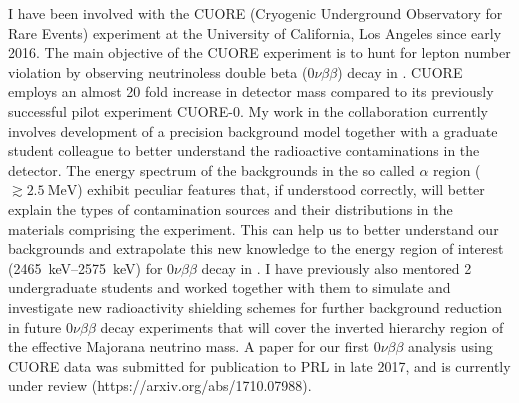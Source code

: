 \documentclass[10pt]{article} %
\begin{document}
I have been involved with the CUORE (Cryogenic Underground Observatory for Rare
Events) experiment at the University of California, Los Angeles since early
2016. The main objective of the CUORE experiment is to hunt for lepton number
violation by observing neutrinoless double beta ($0\nu\beta\beta$) decay in
. CUORE employs an almost 20 fold increase in detector mass
compared to its previously successful pilot experiment CUORE-0. My work in the
collaboration currently involves development of a precision background model
together with a graduate student colleague to better understand the radioactive
contaminations in the detector. The energy spectrum of the backgrounds in the
so called $\alpha$ region ($\gtrsim \SI{2.5}{\mega\electronvolt}$) exhibit
peculiar features that, if understood correctly, will better explain the types
of contamination sources and their distributions in the materials comprising
the experiment. This can help us to better understand our backgrounds and
extrapolate this new knowledge to the energy region of interest
(\SIrange{2465}{2575}{\kilo\electronvolt}) for $0\nu\beta\beta$ decay in
. I have previously also mentored 2 undergraduate students and
worked together with them to simulate and investigate new radioactivity
shielding schemes for further background reduction in future $0\nu\beta\beta$
decay experiments that will cover the inverted hierarchy region of the
effective Majorana neutrino mass.
A paper for our first $0\nu\beta\beta$ analysis using CUORE data
was submitted for publication to PRL in late 2017, and is currently under
review (https://arxiv.org/abs/1710.07988).


\end{document}
